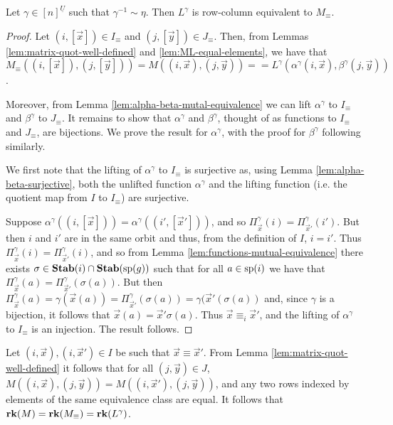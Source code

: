 \documentclass[../paper.tex]{subfiles}
\begin{document}
\begin{thm}
  Let $\gamma \in [n]^{\underline{U}}$ such that $\gamma^{-1} \sim \eta$. Then
  $L^{\gamma}$ is row-column equivalent to $M_{\equiv}$.
  \label{thm:LM-equivalence}
\end{thm}
\begin{proof}
  Let $(i, [\vec{x}]) \in I_\equiv$ and $(j, [\vec{y}]) \in J_\equiv$. Then,
  from Lemmas \ref{lem:matrix-quot-well-defined} and
  \ref{lem:ML-equal-elements}, we have that $M_\equiv ((i, [\vec{x}]), (j,
  [\vec{y}])) = M ((i, \vec{x}), (j, \vec{y}))= = L^{\gamma}(\alpha^{\gamma}(i,
  \vec{x}), \beta^{\gamma}(j, \vec{y}))$.

  Moreover, from Lemma \ref{lem:alpha-beta-mutal-equivalence} we can lift
  $\alpha^\gamma$ to $I_\equiv$ and $\beta^{\gamma}$ to $J_\equiv$. It remains
  to show that $\alpha^\gamma$ and $\beta^{\gamma}$, thought of as functions to
  $I_\equiv$ and $J_\equiv$, are bijections. We prove the result for
  $\alpha^{\gamma}$, with the proof for $\beta^\gamma$ following similarly.

  We first note that the lifting of $\alpha^{\gamma}$ to $I_\equiv$ is
  surjective as, using Lemma \ref{lem:alpha-beta-surjective}, both the unlifted
  function $\alpha^{\gamma}$ and the lifting function (i.e. the quotient map
  from $I$ to $I_\equiv$) are surjective.

  Suppose $\alpha^{\gamma}((i, [\vec{x}])) = \alpha^{\gamma}((i', [\vec{x}']))$,
  and so $\Pi^{\gamma}_{\vec{x}}(i) = \Pi^{\gamma}_{\vec{x}'}(i')$. But then $i$
  and $i'$ are in the same orbit and thus, from the definition of $I$, $i = i'$.
  Thus $\Pi^{\gamma}_{\vec{x}}(i) = \Pi^{\gamma}_{\vec{x}'}(i)$, and so from
  Lemma \ref{lem:functions-mutual-equivalence} there exists $\sigma \in \text{\textbf{Stab}}(i)
  \cap \text{\textbf{Stab}} (\text{sp} (g))$ such that for all $a \in \text{sp}(i)$ we have that
  $\Pi^{\gamma}_{\vec{x}}(a) = \Pi^{\gamma}_{\vec{x}'} (\sigma (a))$. But then
  $\Pi^{\gamma}_{\vec{x}}(a) = \gamma (\vec{x}(a)) =
  \Pi^{\gamma}_{\vec{x}'}(\sigma (a)) = \gamma (\vec{x}' (\sigma (a))$ and,
  since $\gamma$ is a bijection, it follows that $\vec{x}(a) = \vec{x}' \sigma
  (a)$. Thus $\vec{x} \equiv_i \vec{x}'$, and the lifting of $\alpha^{\gamma}$
  to $I_{\equiv}$ is an injection. The result follows.
\end{proof}

Let $(i,\vec{x}), (i, \vec{x}') \in I$ be such that $\vec{x} \equiv \vec{x}'$. From Lemma \ref{lem:matrix-quot-well-defined} it follows that for all $(j, \vec{y}) \in J$, $M((i, \vec{x}), (j, \vec{y})) = M((i, \vec{x}'), (j, \vec{y}))$, and any two rows indexed by elements of the same equivalence class are equal. It follows that $\text{\textbf{rk}} (M) = \text{\textbf{rk}} (M_{\equiv}) = \text{\textbf{rk}} (L^{\gamma})$.
\end{document}
